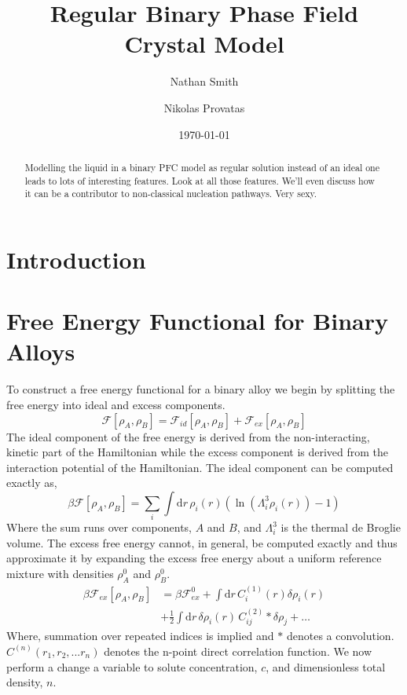 \documentclass[showkeys, prb, reprint]{revtex4-1}
\newcommand{\F}{\mathcal{F}}
\newcommand{\A}{\rho_A}
\newcommand{\B}{\rho_B}
\newcommand{\dd}{\mathrm{d}}
\renewcommand{\d}{\delta}
\renewcommand{\l}{\left}
\renewcommand{\r}{\right}
\newcommand{\f}{\frac}
\begin{document}

\title{Regular Binary Phase Field Crystal Model}
\author{Nathan Smith}
\author{Nikolas Provatas}
\date{\today}

\begin{abstract}

Modelling the liquid in a binary PFC model as regular solution instead of an
ideal one leads to lots of interesting features. Look at all those features.
We'll even discuss how it can be a contributor to non-classical nucleation
pathways. Very sexy.

\end{abstract}


\maketitle


\section{Introduction}

\section{Free Energy Functional for Binary Alloys}

To construct a free energy functional for a binary alloy we begin by splitting
the free energy into ideal and excess components.
%
\begin{equation}
	\mathcal{F}[\A, \B] = \F_{id}[\A, \B] + \F_{ex}[\A, \B]
\end{equation}
%
The ideal component of the free energy is derived from the non-interacting,
kinetic part of the Hamiltonian while the excess component is derived from the
interaction potential of the Hamiltonian. The ideal component can be computed
exactly as, 
%
\begin{equation}
    \beta\F[\A, \B] = \sum_{i} \int \dd r\, \rho_i(r)
        \l(\ln\l(\Lambda_i^3\rho_i(r)\r) -1 \r)
\end{equation}
%
Where the sum runs over components, $A$ and $B$, and $\Lambda_i^3$ is the
thermal de Broglie volume. The excess free energy cannot, in general, be
computed exactly and thus approximate it by expanding the excess free energy
about a uniform reference mixture with densities $\A^0$ and $\B^0$.
%
\begin{align}
	\beta\F_{ex}[\A, \B]  &= \beta \F_{ex}^0 + \int \dd r \, C_i^{(1)}(r) \d \rho_i(r) \\
		&+ \f{1}{2}\int \dd r\, \d \rho_i(r) \,C^{(2)}_{ij} \ast \d\rho_j  + \dots \nonumber
\end{align}
%
Where, summation over repeated indices is implied and $\ast$ denotes a convolution. $C^{(n)}(r_1, r_2, ...r_n)$ denotes the n-point direct correlation function. We now perform a change a variable to solute concentration, $c$, and dimensionless total density, $n$.
\end{document}

